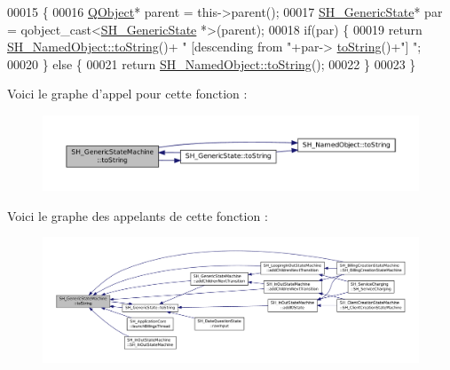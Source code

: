 \begin{DoxyCode}
00015 \{
00016     \hyperlink{classQObject}{QObject}* parent = this->parent();
00017     \hyperlink{classSH__GenericState}{SH\_GenericState}* par = qobject\_cast<\hyperlink{classSH__GenericState}{SH\_GenericState} *>(parent);
00018     \textcolor{keywordflow}{if}(par) \{
00019         \textcolor{keywordflow}{return} \hyperlink{classSH__NamedObject_a9f4b19df6a96a17daaf1060b3019ef47}{SH\_NamedObject::toString}()+ \textcolor{stringliteral}{" [descending from "}+par->
      \hyperlink{classSH__GenericState_a7779babbb40f3f8faa71112204d9804f}{toString}()+\textcolor{stringliteral}{"] "};
00020     \} \textcolor{keywordflow}{else} \{
00021         \textcolor{keywordflow}{return} \hyperlink{classSH__NamedObject_a9f4b19df6a96a17daaf1060b3019ef47}{SH\_NamedObject::toString}();
00022     \}
00023 \}
\end{DoxyCode}


Voici le graphe d'appel pour cette fonction \-:
\nopagebreak
\begin{figure}[H]
\begin{center}
\leavevmode
\includegraphics[width=350pt]{classSH__GenericStateMachine_a85c0c1c9d258ae991f84667412fa47cd_cgraph}
\end{center}
\end{figure}




Voici le graphe des appelants de cette fonction \-:
\nopagebreak
\begin{figure}[H]
\begin{center}
\leavevmode
\includegraphics[width=350pt]{classSH__GenericStateMachine_a85c0c1c9d258ae991f84667412fa47cd_icgraph}
\end{center}
\end{figure}


